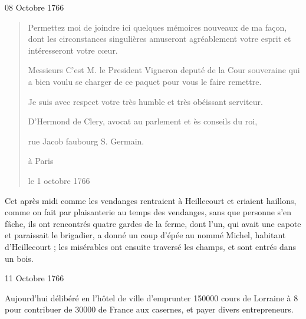 \begin{diary}{08 Octobre 1766}{}
\begin{quote}
                              Permettez moi de joindre ici quelques mémoires
                              nouveaux de ma façon, dont les circonstances
                              singulières amuseront agréablement votre
                              esprit et intéresseront votre cœur. \bigskip

         Messieurs
                              C’est M. le President
                                 Vigneron
                              deputé de la Cour souveraine qui
                              a bien voulu se charger de
                              ce paquet pour vous le faire
                              remettre.
                           \bigskip


                                 Je suis avec respect
                                 votre très humble et très
                                 obéissant serviteur. \begin{flushright}
                                 D’Hermond de Clery, avocat
                                 au parlement et ès conseils du
                                 roi, \end{flushright}

                                    rue Jacob faubourg S. Germain.

                                    à Paris

                                 le 1 octobre
                                    1766
                              \end{quote}

                           Cet après midi comme les vendanges rentraient
                           à Heillecourt et
                           criaient haillons, comme
                           on fait par plaisanterie au temps des vendanges,
                           sans que personne s’en fâche, ils ont rencontrés
                           quatre gardes de la ferme, dont l’un, qui
                           avait une capote et paraissait le brigadier,
                           a donné un coup d’épée au nommé
                              Michel,
                           habitant d’Heillecourt ;
                           les misérables ont
                           ensuite traversé les champs, et sont
                           entrés dans un bois. \bigskip


                     \end{diary}


                     \begin{diary}{11 Octobre 1766}{}

                         Aujourd'hui délibéré en l’hôtel de ville
                           d’emprunter 150000 cours de Lorraine à
                           8 %
                           pour contribuer de 30000 de France aux
                           casernes, et payer
                           divers entrepreneurs. \bigskip


                     \end{diary}

